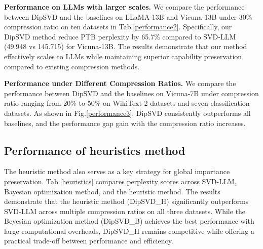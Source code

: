 \documentclass[11pt]{article}
\begin{document}
\textbf{Performance on LLMs with larger scales.} We compare the performance between DipSVD and the baselines on LLaMA-13B and Vicuna-13B under 30\% compression ratio on ten datasets in Tab.\ref{performance2}. Specifically, our DipSVD method reduce PTB perplexity by 65.7\% compared to SVD-LLM (49.948 vs 145.715) for Vicuna-13B. The results demonstrate that our method effectively scales to LLMs while maintaining superior capability preservation compared to existing compression methods.

\textbf{Performance under Different Compression Ratios.} We compare the performance between DipSVD and the baselines on Vicuna-7B under compression ratio ranging from 20\% to 50\% on WikiText-2 datasets and seven classification datasets. As shown in Fig.\ref{performance3}, DipSVD consistently outperforms all baselines, and the performance gap gain with the compression ratio increases.


\subsection{Performance of heuristics method}

The heuristic method also serves as a key strategy for global importance preservation. Tab.\ref{heuristics} compares perplexity scores across SVD-LLM, Bayesian optimization method, and the heuristic method. The results demonstrate that the heuristic method (DipSVD\_H) significantly outperforms SVD-LLM across multiple compression ratios on all three datasets. While the Beyesian optimization method (DipSVD\_B) achieves the best performance with large computational overheads, DipSVD\_H remains competitive while offering a practical trade-off between performance and efficiency.
\end{document}
